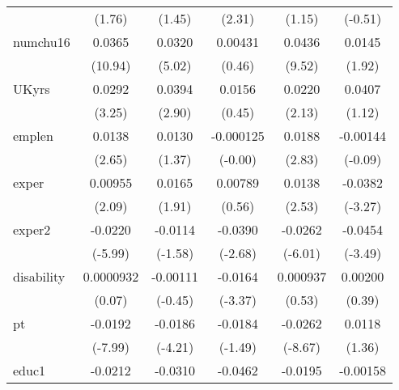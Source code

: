 \begin{table}[htbp]
\begin{tabular}{l*{5}{c}}
            &      (1.76)         &      (1.45)         &      (2.31)         &      (1.15)         &     (-0.51)         \\
numchu16    &      0.0365\sym{***}&      0.0320\sym{***}&     0.00431         &      0.0436\sym{***}&      0.0145         \\
            &     (10.94)         &      (5.02)         &      (0.46)         &      (9.52)         &      (1.92)         \\
UKyrs       &      0.0292\sym{**} &      0.0394\sym{**} &      0.0156         &      0.0220\sym{*}  &      0.0407         \\
            &      (3.25)         &      (2.90)         &      (0.45)         &      (2.13)         &      (1.12)         \\
emplen      &      0.0138\sym{**} &      0.0130         &   -0.000125         &      0.0188\sym{**} &    -0.00144         \\
            &      (2.65)         &      (1.37)         &     (-0.00)         &      (2.83)         &     (-0.09)         \\
exper       &     0.00955\sym{*}  &      0.0165         &     0.00789         &      0.0138\sym{*}  &     -0.0382\sym{**} \\
            &      (2.09)         &      (1.91)         &      (0.56)         &      (2.53)         &     (-3.27)         \\
exper2      &     -0.0220\sym{***}&     -0.0114         &     -0.0390\sym{**} &     -0.0262\sym{***}&     -0.0454\sym{***}\\
            &     (-5.99)         &     (-1.58)         &     (-2.68)         &     (-6.01)         &     (-3.49)         \\
disability  &   0.0000932         &    -0.00111         &     -0.0164\sym{***}&    0.000937         &     0.00200         \\
            &      (0.07)         &     (-0.45)         &     (-3.37)         &      (0.53)         &      (0.39)         \\
pt          &     -0.0192\sym{***}&     -0.0186\sym{***}&     -0.0184         &     -0.0262\sym{***}&      0.0118         \\
            &     (-7.99)         &     (-4.21)         &     (-1.49)         &     (-8.67)         &      (1.36)         \\
educ1       &     -0.0212\sym{***}&     -0.0310\sym{***}&     -0.0462\sym{***}&     -0.0195\sym{***}&    -0.00158         \\

\end{tabular}
\end{table}
